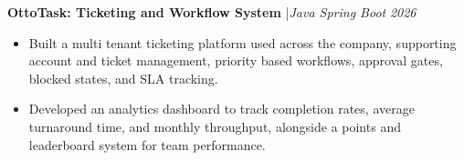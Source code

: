 \documentclass[a4paper,10pt]{article}
\newcommand{\projrow}[3]{%
    \noindent
    {\bfseries\color{dark}#1}%
    {\color{light}\enspace|\enspace\small\itshape #2}%
    \hfill{\small\color{light}\itshape #3}%
}
\begin{document}
\vspace{3pt}

\projrow{OttoTask: Ticketing and Workflow System}
{Java Spring Boot}{2026}

\vspace{2pt}

\begin{itemize}

\item Built a multi tenant ticketing platform used across the company,
supporting account and ticket management, priority based workflows,
approval gates, blocked states, and SLA tracking.

\item Developed an analytics dashboard to track completion rates,
average turnaround time, and monthly throughput, alongside a points
and leaderboard system for team performance.

\end{itemize}
\end{document}
